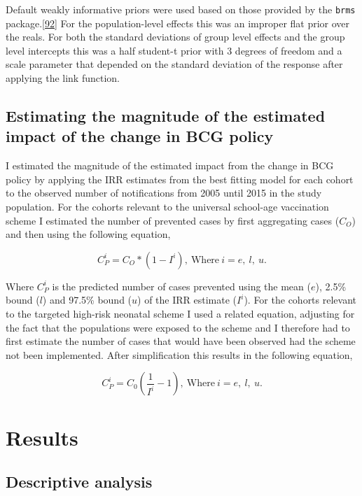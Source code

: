 \documentclass[11pt,twoside]{bristolthesis}
\begin{document}
  Default weakly informative priors were used based on those provided by the \texttt{brms} package.{[}\protect\hyperlink{ref-Burkner}{92}{]} For the population-level effects this was an improper flat prior over the reals. For both the standard deviations of group level effects and the group level intercepts this was a half student-t prior with 3 degrees of freedom and a scale parameter that depended on the standard deviation of the response after applying the link function.
  
  \hypertarget{magnitude-estimation}{%
  \subsection{Estimating the magnitude of the estimated impact of the change in BCG policy}\label{magnitude-estimation}}
  
  I estimated the magnitude of the estimated impact from the change in BCG policy by applying the IRR estimates from the best fitting model for each cohort to the observed number of notifications from 2005 until 2015 in the study population. For the cohorts relevant to the universal school-age vaccination scheme I estimated the number of prevented cases by first aggregating cases (\(C_O\)) and then using the following equation,
  
  \[ C^i_P = C_O * (1 - I^i),\ \text{Where}\ i = e,\ l,\ u.\]
  
  Where \(C^i_P\) is the predicted number of cases prevented using the mean (\(e\)), 2.5\% bound (\(l\)) and 97.5\% bound (\(u\)) of the IRR estimate (\(I^i\)). For the cohorts relevant to the targeted high-risk neonatal scheme I used a related equation, adjusting for the fact that the populations were exposed to the scheme and I therefore had to first estimate the number of cases that would have been observed had the scheme not been implemented. After simplification this results in the following equation,
  
  \[ C^i_P =  C_0\left(\frac{1}{I^i } - 1\right),\ \text{Where}\ i = e,\ l,\ u.\]
  
  \hypertarget{results-2}{%
  \section{Results}\label{results-2}}
  
  \hypertarget{descriptive-analysis}{%
  \subsection{Descriptive analysis}\label{descriptive-analysis}}
  
\end{document}
